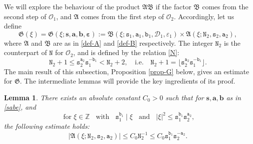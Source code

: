 \documentclass[12pt, twoside]{article}
\newtheorem{lemma}[theorem]{Lemma}
\theoremstyle{definition}
\numberwithin{equation}{section}
\begin{document}
We will explore the behaviour of the product $\mathfrak A \mathfrak B$ if the factor $\mathfrak B$ comes from the second step of $\mathscr{O}_1$, and
$\mathfrak A$ comes from the first step of $\mathscr{O}_2$. Accordingly, let us define 
\begin{equation} \label{def-G} 
\mathfrak G(\xi) = \mathfrak G(\xi; \mathbf s, \mathbf a, \mathbf b, \pmb{\varepsilon}) := \mathfrak B(\xi; \mathtt s_1, \mathtt a_1, \mathtt b_1, \mathscr{D}_1, \varepsilon_1)  \times \mathfrak A(\xi; \mathtt N_2, \mathtt s_2, \mathtt a_2), 
\end{equation}   
where $\mathfrak A$ and $\mathfrak B$ are as in \eqref{def-A} and \eqref{def-B} respectively. The integer $\mathtt N_2$ is the counterpart of $\mathtt N$ for $\mathscr{O}_2$, and is defined by the relation \eqref{N}:  
\begin{equation} \label{N2} 
\mathtt N_2 + 1 \leq \mathtt s_2^{\mathtt a_2} \mathtt s_1^{-\mathtt b_1} < \mathtt N_2 + 2, \quad \text{i.e.} \quad \mathtt N_2 + 1 = \lfloor {\mathtt s_2^{\mathtt a_2}}{\mathtt s_1^{-\mathtt b_1}} \rfloor.  
\end{equation} 
The main result of this subsection, Proposition \ref{prop-G} below, gives an estimate for $\mathfrak G$. The intermediate lemmas will provide the key ingredients of its proof.  
\begin{lemma} \label{A2-lemma}
There exists an absolute constant $C_0 > 0$ such that for $\mathbf s, \mathbf a, \mathbf b$ as in \eqref{sabe}, and  
\begin{equation} \label{xi-range-0} 
\text{ for } \xi \in \mathbb Z \; \; \text{ with } \; \; \mathtt s_1^{\mathtt b_1} \mid \xi \; \;  \text{ and } \; \; |\xi|^2 \leq \mathtt s_1^{\mathtt b_1} \mathtt s_2^{\mathtt a_2}, 
\end{equation} the following estimate holds:  
\begin{equation} \label{A2} \bigl|\mathfrak A(\xi; \mathtt N_2, \mathtt s_2, \mathtt a_2) \bigr| \leq C_0 \mathtt N_2^{-1} \leq C_0 \mathtt s_1^{\mathtt b_1} \mathtt s_2^{-\mathtt a_2}. \end{equation}  
\end{lemma} 
\end{document}
